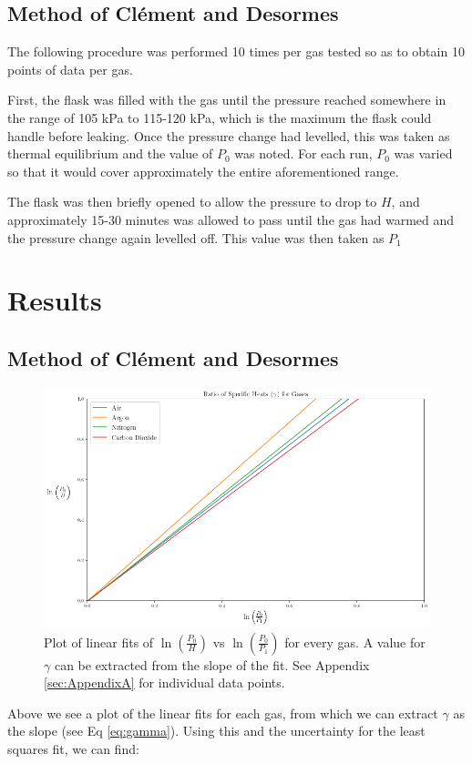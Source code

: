 \documentclass[12pt]{article}
\begin{document}
\subsection{Method of Clément and Desormes}
The following procedure was performed 10 times per gas tested so as to obtain 10 points of data per gas.

First, the flask was filled with the gas until the pressure reached somewhere in the range of 105 kPa to 115-120 kPa, which is the maximum the flask could handle before leaking. Once the pressure change had levelled, this was taken as thermal equilibrium and the value of $P_0$ was noted. For each run, $P_0$ was varied so that it would cover approximately the entire aforementioned range.

The flask was then briefly opened to allow the pressure to drop to $H$, and approximately 15-30 minutes was allowed to pass until the gas had warmed and the pressure change again levelled off. This value was then taken as $P_1$

\section{Results}
\subsection{Method of Clément and Desormes}
\begin{figure}[h]
	\includegraphics[width=1\textwidth]{Figures/Clement_All}
	\caption{Plot of linear fits of $\ln \left( \frac{{P_0}}{{H}} \right)$ vs $\ln \left( \frac{{P_0}}{{P_1}} \right)$ for every gas. A value for $\gamma$ can be extracted from the slope of the fit. See Appendix \ref{sec:AppendixA} for individual data points.}
\end{figure}
Above we see a plot of the linear fits for each gas, from which we can extract $\gamma$ as the slope (see Eq \ref{eq:gamma}). Using this and the uncertainty for the least squares fit, we can find:
\end{document}
